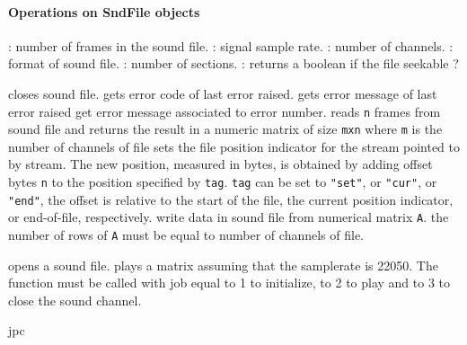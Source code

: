 \paragraph{Operations on SndFile objects}
\begin{itemize}
  : number of frames in the sound file. 
  : signal sample rate.
  : number of channels. 
  :  format of sound file. 
  : number of sections.
  : returns a boolean if the file seekable ? 
\end{itemize}
\begin{itemize}
   closes sound file. 
   gets error code of last error raised. 
   gets error message of last error raised
   get error message associated to error number.
    reads \verb+n+ frames from sound file and returns the 
  result in a numeric matrix of size \verb+mxn+ where \verb+m+ is the 
  number of channels of file
   sets the file position indicator for the stream pointed
       to by stream.  The new position, measured in bytes, is obtained  by  adding
       offset  bytes \verb+n+  to  the  position  specified by \verb+tag+. 
        \verb+tag+ can be set to \verb+"set"+, or \verb+"cur"+, or \verb+"end"+, 
	the offset is relative to the start of the
       file, the current position indicator, or end-of-file, respectively.
   write data in sound file from numerical matrix \verb+A+. 
  the number of rows of \verb+A+ must be equal to number of channels of file.
\end{itemize}

\begin{itemize}
   opens a sound file. 
     plays a matrix assuming that the samplerate is 22050.
    The function must be called with job equal to 1 to initialize, to 2 to play 
    and to 3 to close the sound channel.
\end{itemize}

\begin{examples}
  \begin{program}
  \end{program}
\end{examples}

\begin{manseealso}

\end{manseealso}

\begin{authors}
jpc 
\end{authors}

